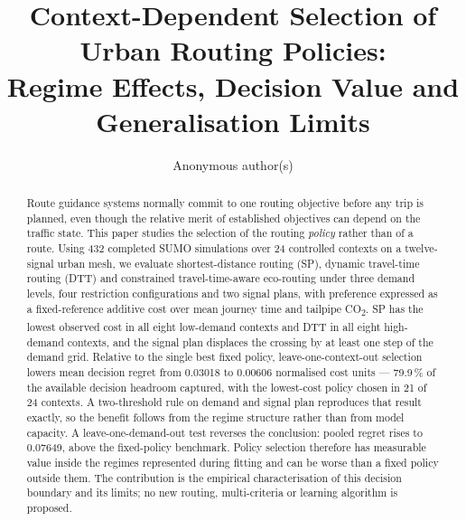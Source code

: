 \documentclass[runningheads]{llncs}
\newcommand{\CO}{CO\textsubscript{2}}
\begin{document}
\title{Context-Dependent Selection of Urban Routing Policies:\\
Regime Effects, Decision Value and Generalisation Limits}

\author{Anonymous author(s)}

\maketitle

\begin{abstract}
Route guidance systems normally commit to one routing objective before any trip is
planned, even though the relative merit of established objectives can depend on the
traffic state. This paper studies the selection of the routing \emph{policy} rather than
of a route. Using 432 completed SUMO simulations over 24 controlled contexts on a
twelve-signal urban mesh, we evaluate shortest-distance routing (SP), dynamic
travel-time routing (DTT) and constrained travel-time-aware eco-routing under three
demand levels, four restriction configurations and two signal plans, with preference
expressed as a fixed-reference additive cost over mean journey time and tailpipe \CO.
SP has the lowest observed cost in all eight low-demand contexts and DTT in all eight
high-demand contexts, and the signal plan displaces the crossing by at least one step of
the demand grid. Relative to the single best fixed policy, leave-one-context-out
selection lowers mean decision regret from 0.03018 to 0.00606 normalised cost units ---
79.9\,\% of the available decision headroom captured, with the lowest-cost policy chosen
in 21 of 24 contexts. A two-threshold rule on demand and signal plan reproduces that
result exactly, so the benefit follows from the regime structure rather than from model
capacity. A leave-one-demand-out test reverses the conclusion: pooled regret rises to
0.07649, above the fixed-policy benchmark. Policy selection therefore has measurable
value inside the regimes represented during fitting and can be worse than a fixed policy
outside them. The contribution is the empirical characterisation of this decision
boundary and its limits; no new routing, multi-criteria or learning algorithm is
proposed.
\end{abstract}
\end{document}
